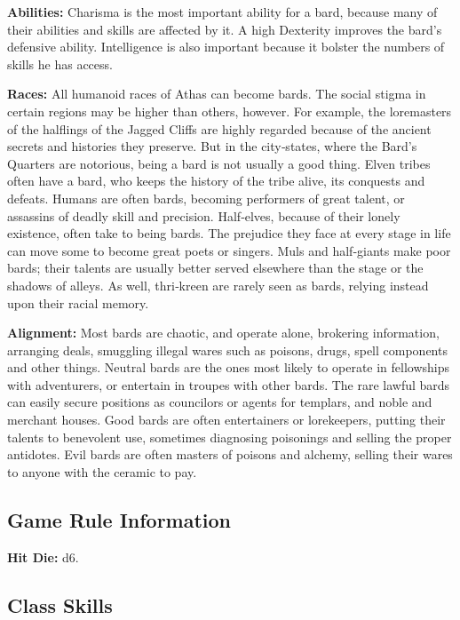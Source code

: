 \textbf{Abilities:} Charisma is the most important ability for a bard, because many of their abilities and skills are affected by it. A high Dexterity improves the bard's defensive ability. Intelligence is also important because it bolster the numbers of skills he has access.

\textbf{Races:} All humanoid races of Athas can become bards. The social stigma in certain regions may be higher than others, however. For example, the loremasters of the halflings of the Jagged Cliffs are highly regarded because of the ancient secrets and histories they preserve. But in the city‐states, where the Bard's Quarters are notorious, being a bard is not usually a good thing. Elven tribes often have a bard, who keeps the history of the tribe alive, its conquests and defeats. Humans are often bards, becoming performers of great talent, or assassins of deadly skill and precision. Half‐elves, because of their lonely existence, often take to being bards. The prejudice they face at every stage in life can move some to become great poets or singers. Muls and half‐giants make poor bards; their talents are usually better served elsewhere than the stage or the shadows of alleys. As well, thri‐kreen are rarely seen as bards, relying instead upon their racial memory.

\textbf{Alignment:} Most bards are chaotic, and operate alone, brokering information, arranging deals, smuggling illegal wares such as poisons, drugs, spell components and other things. Neutral bards are the ones most likely to operate in fellowships with adventurers, or entertain in troupes with other bards. The rare lawful bards can easily secure positions as councilors or agents for templars, and noble and merchant houses. Good bards are often entertainers or lorekeepers, putting their talents to benevolent use, sometimes diagnosing poisonings and selling the proper antidotes. Evil bards are often masters of poisons and alchemy, selling their wares to anyone with the ceramic to pay.

\subsection{Game Rule Information}

\textbf{Hit Die:} d6.

\subsection{Class Skills}

